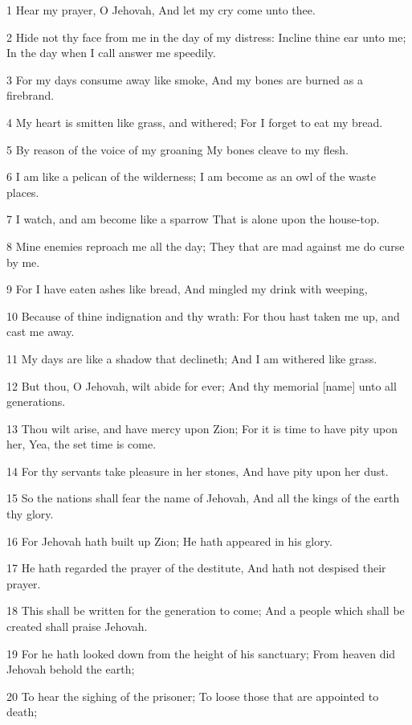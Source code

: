 \par 1 Hear my prayer, O Jehovah, And let my cry come unto thee.
\par 2 Hide not thy face from me in the day of my distress: Incline thine ear unto me; In the day when I call answer me speedily.
\par 3 For my days consume away like smoke, And my bones are burned as a firebrand.
\par 4 My heart is smitten like grass, and withered; For I forget to eat my bread.
\par 5 By reason of the voice of my groaning My bones cleave to my flesh.
\par 6 I am like a pelican of the wilderness; I am become as an owl of the waste places.
\par 7 I watch, and am become like a sparrow That is alone upon the house-top.
\par 8 Mine enemies reproach me all the day; They that are mad against me do curse by me.
\par 9 For I have eaten ashes like bread, And mingled my drink with weeping,
\par 10 Because of thine indignation and thy wrath: For thou hast taken me up, and cast me away.
\par 11 My days are like a shadow that declineth; And I am withered like grass.
\par 12 But thou, O Jehovah, wilt abide for ever; And thy memorial [name] unto all generations.
\par 13 Thou wilt arise, and have mercy upon Zion; For it is time to have pity upon her, Yea, the set time is come.
\par 14 For thy servants take pleasure in her stones, And have pity upon her dust.
\par 15 So the nations shall fear the name of Jehovah, And all the kings of the earth thy glory.
\par 16 For Jehovah hath built up Zion; He hath appeared in his glory.
\par 17 He hath regarded the prayer of the destitute, And hath not despised their prayer.
\par 18 This shall be written for the generation to come; And a people which shall be created shall praise Jehovah.
\par 19 For he hath looked down from the height of his sanctuary; From heaven did Jehovah behold the earth;
\par 20 To hear the sighing of the prisoner; To loose those that are appointed to death;
